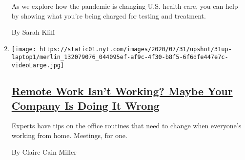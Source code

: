 \begin{enumerate}
  As we explore how the pandemic is changing U.S. health care, you can
  help by showing what you're being charged for testing and treatment.

  By Sarah Kliff
\item
  \texttt{[image: https://static01.nyt.com/images/2020/07/31/upshot/31up-laptop1/merlin\_132079076\_044095ef-af9c-4f30-b8f5-6f6dfe447e7c-videoLarge.jpg]}

  \hypertarget{remote-work-isnt-working-maybe-your-company-is-doing-it-wrong}{%
  \subsection{\texorpdfstring{\href{/2020/07/31/upshot/remote-work-tips.html}{Remote
  Work Isn't Working? Maybe Your Company Is Doing It
  Wrong}}{Remote Work Isn't Working? Maybe Your Company Is Doing It Wrong}}\label{remote-work-isnt-working-maybe-your-company-is-doing-it-wrong}}

  Experts have tips on the office routines that need to change when
  everyone's working from home. Meetings, for one.

  By Claire Cain Miller
\end{enumerate}

